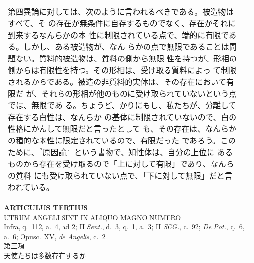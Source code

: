 \documentclass[10pt]{jsarticle} %
\begin{document}
\begin{longtable}{p{21em}p{21em}}
 第四異論に対しては、次のように言われるべきである。被造物はすべて、そ
 の存在が無条件に自存するものでなく、存在がそれに到来するなんらかの本
 性に制限されている点で、端的に有限である。しかし、ある被造物が、なん
 らかの点で無限であることは問題ない。質料的被造物は、質料の側から無限
 性を持つが、形相の側からは有限性を持つ。その形相は、受け取る質料によっ
 て制限されるからである。被造の非質料的実体は、その存在において有限だ
 が、それらの形相が他のものに受け取られていないという点では、無限であ
 る。ちょうど、かりにもし、私たちが、分離して存在する白性は、なんらか
 の基体に制限されていないので、白の性格にかんして無限だと言ったとして
 も、その存在は、なんらかの種的な本性に限定されているので、有限だった
 であろう。このために、『原因論』という書物で、知性体は、自分の上位に
 あるものから存在を受け取るので「上に対して有限」であり、なんらの質料
 にも受け取られていない点で、「下に対して無限」だと言われている。

\end{longtable}
\newpage



\begin{center}
 {\Large {\bf ARTICULUS TERTIUS}}\\
 {\large UTRUM ANGELI SINT IN ALIQUO MAGNO NUMERO}\\
 {\footnotesize Infra, q.~112, a.~4, ad 2; II {\itshape Sent.}, d.~3,
 q.~1, a.~3; II {\itshape SCG.}, c.~92; {\itshape De Pot.}, q.~6, a.~6;
 Opusc.~XV, {\itshape de Angelis}, c.~2.}\\
 {\Large 第三項\\天使たちは多数存在するか}
\end{center}
\end{document}
